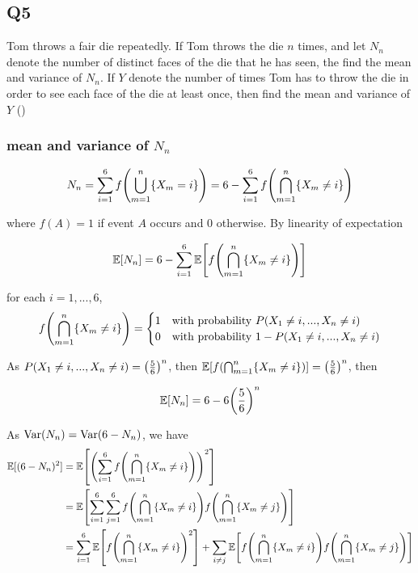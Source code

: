 \documentclass{article}
\begin{document}
\subsection{Q5}

Tom throws a fair die repeatedly. If Tom throws the die $n$ times, and let $N_n$ denote the number of distinct faces of the die that he has seen, the find the mean and variance of $N_n$. If $Y$ denote the number of times Tom has to throw the die in order to see each face of the die at least once, then find the mean and variance of $Y$ ()

\subsubsection{mean and variance of $N_n$}

$$
    N_n = \sum_{i=1}^6 f\tuple*{\bigcup_{m=1}^n \set{X_m = i}} = 6 - \sum_{i=1}^6 f\tuple*{\bigcap_{m=1}^n \set{X_m \neq i}}
$$

where $f(A) = 1$ if event $A$ occurs and $0$ otherwise. By linearity of expectation

$$
    \Exp[N_n] = 6 - \sum_{i=1}^6 \Exp\bracket*{f\tuple*{\bigcap_{m=1}^n \set{X_m \neq i}}}
$$

for each $i=1, ..., 6$,
$$
    f\tuple*{\bigcap_{m=1}^n \set{X_m \neq i}} = \begin{cases}
        1 &\text{with probability $P(X_1 \neq i, ..., X_n \neq i)$} \\
        0 &\text{with probability $1 - P(X_1 \neq i, ..., X_n \neq i)$}
    \end{cases}
$$

As $P(X_1 \neq i, ..., X_n \neq i) = \tuple*{\frac{5}{6}}^n$, then $\Exp\bracket*{f\tuple*{\bigcap_{m=1}^n \set{X_m \neq i}}} = \tuple*{\frac{5}{6}}^n$, then

$$
    \Exp[N_n] = 6 - 6 \tuple*{\frac{5}{6}}^n
$$

As $\Var(N_n) = \Var(6 - N_n)$, we have
\begin{align*}
    \Exp[(6 - N_n)^2]
    &= \Exp\bracket*{\tuple*{\sum_{i=1}^6 f\tuple*{\bigcap_{m=1}^n \set{X_m \neq i}}}^2} \\
    &= \Exp\bracket*{\sum_{i=1}^6 \sum_{j=1}^6 f\tuple*{\bigcap_{m=1}^n \set{X_m \neq i}} f\tuple*{\bigcap_{m=1}^n \set{X_m \neq j}} } \\
    &= \sum_{i=1}^6 \Exp\bracket*{f\tuple*{\bigcap_{m=1}^n \set{X_m \neq i}}^2 } + \sum_{i \neq j} \Exp\bracket*{f\tuple*{\bigcap_{m=1}^n \set{X_m \neq i}} f\tuple*{\bigcap_{m=1}^n \set{X_m \neq j}}} \\
\end{align*}
\end{document}
